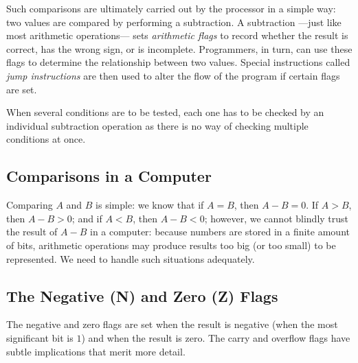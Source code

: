 \begin{Shaded}
\end{Shaded}

Such comparisons are ultimately carried out by the processor in a simple
way: two values are compared by performing a subtraction. A subtraction
---just like most arithmetic operations--- sets \emph{arithmetic flags}
to record whether the result is correct, has the wrong sign, or is
incomplete. Programmers, in turn, can use these flags to determine the
relationship between two values. Special instructions called \emph{jump
instructions} are then used to alter the flow of the program if certain
flags are set.

When several conditions are to be tested, each one has to be checked by
an individual subtraction operation as there is no way of checking
multiple conditions at once.

\subsection{Comparisons in a Computer}\label{comparisons-in-a-computer}

Comparing $A$ and $B$ is simple: we know that if $A=B$, then $A-B=0$. If
$A>B$, then $A-B>0$; and if $A < B$, then $A-B<0$; however, we cannot
blindly trust the result of $A-B$ in a computer: because numbers are
stored in a finite amount of bits, arithmetic operations may produce
results too big (or too small) to be represented. We need to handle such
situations adequately.

\subsection{The Negative (N) and Zero (Z)
Flags}\label{the-negative-n-and-zero-z-flags}

The negative and zero flags are set when the result is negative (when
the most significant bit is $1$) and when the result is zero. The carry
and overflow flags have subtle implications that merit more detail.


